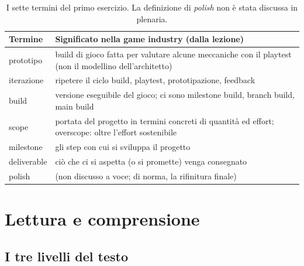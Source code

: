 \begin{table}[htbp]
\centering
\small
\begin{tabular}{@{}lp{9.6cm}@{}}
\toprule
\textbf{Termine} & \textbf{Significato nella game industry (dalla lezione)} \\
\midrule
prototipo & build di gioco fatta per valutare alcune meccaniche con il
playtest (non il modellino dell'architetto) \\
iterazione & ripetere il ciclo build, playtest, prototipazione, feedback \\
build & versione eseguibile del gioco; ci sono milestone build, branch build,
main build \\
scope & portata del progetto in termini concreti di quantità ed effort;
overscope: oltre l'effort sostenibile \\
milestone & gli step con cui si sviluppa il progetto \\
deliverable & ciò che ci si aspetta (o si promette) venga consegnato \\
polish & (non discusso a voce; di norma, la rifinitura finale) \\
\bottomrule
\end{tabular}
\caption{I sette termini del primo esercizio. La definizione di
\emph{polish} non è stata discussa in plenaria.}
\label{pt:tab:termini}
\end{table}

\section{Lettura e comprensione}
\label{pt:sec:lettura}

\subsection{I tre livelli del testo}

